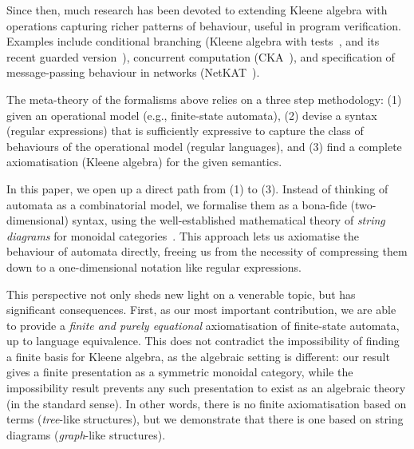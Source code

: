 \documentclass{lmcs}
\theoremstyle{plain}\newtheorem{satz}[thm]{Satz} %
\begin{document}
Since then, much research has been devoted to extending Kleene algebra with operations capturing richer patterns of behaviour, useful in program verification. Examples include conditional branching (Kleene algebra with tests~\cite{kozen1997kleene}, and its recent guarded version~\cite{smolka2019guarded}),  concurrent computation (CKA~\cite{hoare2009concurrent,KappeB0Z18}), and specification of message-passing behaviour in networks (NetKAT~\cite{anderson2014netkat}).

The meta-theory of the formalisms above relies on a three step methodology: (1) given an operational model (e.g., finite-state automata), (2) devise a syntax (regular expressions) that is sufficiently expressive to capture the class of behaviours of the operational model (regular languages), and (3) find a complete axiomatisation (Kleene algebra) for the given semantics.

In this paper, we open up a direct path from (1) to (3). Instead of thinking of automata as a combinatorial model, we formalise them as a bona-fide (two-dimensional) syntax, using the well-established mathematical theory of \emph{string diagrams} for monoidal categories~\cite{Selinger2009}. This approach lets us axiomatise the behaviour of automata directly, freeing us from the necessity of compressing them down to a one-dimensional notation like regular expressions.

This perspective not only sheds new light on a venerable topic, but has significant consequences. First, as our most important contribution, we are able to provide a \emph{finite and purely equational} axiomatisation of finite-state automata, up to language equivalence. This does not contradict the impossibility of finding a finite basis for Kleene algebra, as the algebraic setting is different: our result gives a finite presentation as a symmetric monoidal category, while the impossibility result prevents any such presentation to exist as an algebraic theory (in the standard sense). In other words, there is no finite axiomatisation based on terms (\emph{tree}-like structures), but we demonstrate that there is one based on string diagrams (\emph{graph}-like structures).
\end{document}
